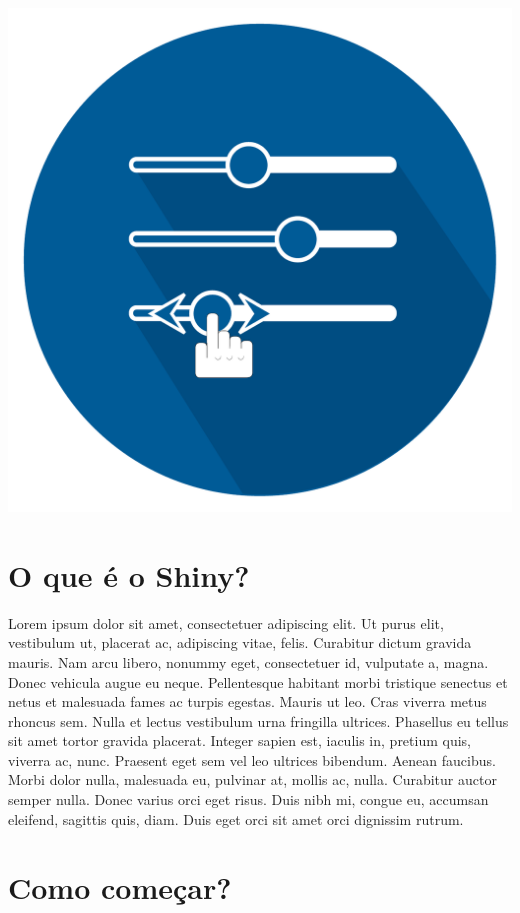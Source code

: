 \documentclass[]{book}
\begin{document}
\begin{center}\includegraphics{images/logo} \end{center}

\chapter{O que é o Shiny?}\label{o-que-e-o-shiny}

Lorem ipsum dolor sit amet, consectetuer adipiscing elit. Ut purus elit,
vestibulum ut, placerat ac, adipiscing vitae, felis. Curabitur dictum
gravida mauris. Nam arcu libero, nonummy eget, consectetuer id,
vulputate a, magna. Donec vehicula augue eu neque. Pellentesque habitant
morbi tristique senectus et netus et malesuada fames ac turpis egestas.
Mauris ut leo. Cras viverra metus rhoncus sem. Nulla et lectus
vestibulum urna fringilla ultrices. Phasellus eu tellus sit amet tortor
gravida placerat. Integer sapien est, iaculis in, pretium quis, viverra
ac, nunc. Praesent eget sem vel leo ultrices bibendum. Aenean faucibus.
Morbi dolor nulla, malesuada eu, pulvinar at, mollis ac, nulla.
Curabitur auctor semper nulla. Donec varius orci eget risus. Duis nibh
mi, congue eu, accumsan eleifend, sagittis quis, diam. Duis eget orci
sit amet orci dignissim rutrum.

\chapter{Como começar?}\label{como-comecar}
\end{document}
